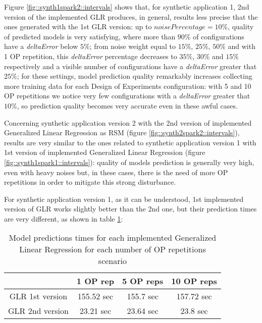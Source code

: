 Figure \ref{fig::synth1spark2::intervals} shows that, for synthetic application 1, 2nd version of the implemented GLR produces, in general, results less precise that the ones generated with the 1st GLR version: up to $noisePercentage = 10\%$, quality of predicted models is very satisfying, where more than $90\%$ of configurations have a \textit{deltaError} below $5\%$; from noise weight equal to $15\%$, $25\%$, $50\%$ and with 1 OP repetition, this \textit{deltaError} percentage decreases to $35\%$, $30\%$ and $15\%$ respectively and a visible number of configurations have a \textit{deltaError} greater that $25\%$; for these settings, model prediction quality remarkably increases collecting more training data for each Design of Experiments configuration: with 5 and 10 OP repetitions we notice very few configurations with a \textit{deltaError} greater that $10\%$, so prediction quality becomes very accurate even in these awful cases.

Concerning synthetic application version 2 with the 2nd version of implemented Generalized Linear Regression as RSM (figure \ref{fig::synth2spark2::intervals}), results are very similar to the ones related to synthetic application version 1 with 1st version of implemented Generalized Linear Regression (figure \ref{fig::synth1spark1::intervals}): quality of models prediction is generally very high, even with heavy noises but, in these cases, there is the need of more OP repetitions in order to mitigate this strong disturbance.

For synthetic application version 1, as it can be understood, 1st implemented version of GLR works slightly better than the 2nd one, but their prediction times are very different, as shown in table \ref{tab::GLRtimes}:

\begin{table}[H]

    \centering
    
    \begin{tabular}{cccc}
    
        \toprule
         & 1 OP rep & 5 OP reps & 10 OP reps \\
        \midrule
        GLR 1st version & 155.52 sec & 155.7 sec & 157.72 sec \\
        GLR 2nd version & 23.21 sec & 23.64 sec & 23.8 sec \\
        \bottomrule 
    
    \end{tabular}

    \caption{Model predictions times for each implemented Generalized Linear Regression for each number of OP repetitions scenario}
    \label{tab::GLRtimes}
    
\end{table}

